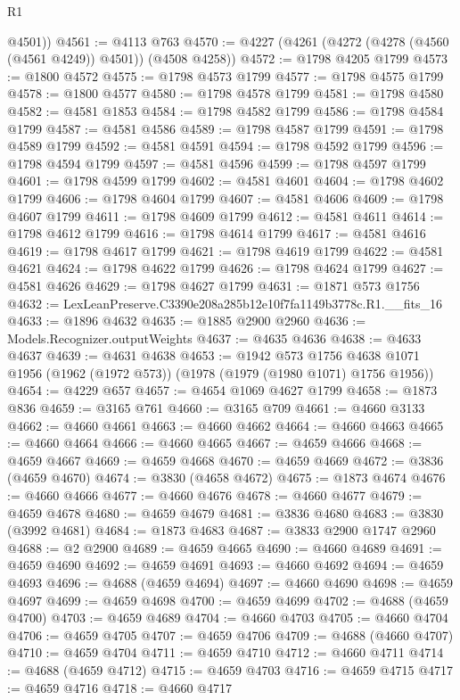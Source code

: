 \begin{lexlean}{R1}
\begin{coremodule}
        @4501))
@4561 := @4113 @763
@4570 := @4227 (@4261 (@4272 (@4278 (@4560 (@4561 @4249)) @4501)) (@4508 @4258))
@4572 := @1798 @4205 @1799
@4573 := @1800 @4572
@4575 := @1798 @4573 @1799
@4577 := @1798 @4575 @1799
@4578 := @1800 @4577
@4580 := @1798 @4578 @1799
@4581 := @1798 @4580
@4582 := @4581 @1853
@4584 := @1798 @4582 @1799
@4586 := @1798 @4584 @1799
@4587 := @4581 @4586
@4589 := @1798 @4587 @1799
@4591 := @1798 @4589 @1799
@4592 := @4581 @4591
@4594 := @1798 @4592 @1799
@4596 := @1798 @4594 @1799
@4597 := @4581 @4596
@4599 := @1798 @4597 @1799
@4601 := @1798 @4599 @1799
@4602 := @4581 @4601
@4604 := @1798 @4602 @1799
@4606 := @1798 @4604 @1799
@4607 := @4581 @4606
@4609 := @1798 @4607 @1799
@4611 := @1798 @4609 @1799
@4612 := @4581 @4611
@4614 := @1798 @4612 @1799
@4616 := @1798 @4614 @1799
@4617 := @4581 @4616
@4619 := @1798 @4617 @1799
@4621 := @1798 @4619 @1799
@4622 := @4581 @4621
@4624 := @1798 @4622 @1799
@4626 := @1798 @4624 @1799
@4627 := @4581 @4626
@4629 := @1798 @4627 @1799
@4631 := @1871 @573 @1756
@4632 := LexLeanPreserve.C3390e208a285b12e10f7fa1149b3778c.R1.__fits_16
@4633 := @1896 @4632
@4635 := @1885 @2900 @2960
@4636 := Models.Recognizer.outputWeights
@4637 := @4635 @4636
@4638 := @4633 @4637
@4639 := @4631 @4638
@4653 := @1942
    @573
    @1756
    @4638
    @1071
    @1956
    (@1962 (@1972 @573))
    (@1978 (@1979 (@1980 @1071) @1756 @1956))
@4654 := @4229 @657
@4657 := @4654 @1069 @4627 @1799
@4658 := @1873 @836
@4659 := @3165 @761
@4660 := @3165 @709
@4661 := @4660 @3133
@4662 := @4660 @4661
@4663 := @4660 @4662
@4664 := @4660 @4663
@4665 := @4660 @4664
@4666 := @4660 @4665
@4667 := @4659 @4666
@4668 := @4659 @4667
@4669 := @4659 @4668
@4670 := @4659 @4669
@4672 := @3836 (@4659 @4670)
@4674 := @3830 (@4658 @4672)
@4675 := @1873 @4674
@4676 := @4660 @4666
@4677 := @4660 @4676
@4678 := @4660 @4677
@4679 := @4659 @4678
@4680 := @4659 @4679
@4681 := @3836 @4680
@4683 := @3830 (@3992 @4681)
@4684 := @1873 @4683
@4687 := @3833 @2900 @1747 @2960
@4688 := @2 @2900
@4689 := @4659 @4665
@4690 := @4660 @4689
@4691 := @4659 @4690
@4692 := @4659 @4691
@4693 := @4660 @4692
@4694 := @4659 @4693
@4696 := @4688 (@4659 @4694)
@4697 := @4660 @4690
@4698 := @4659 @4697
@4699 := @4659 @4698
@4700 := @4659 @4699
@4702 := @4688 (@4659 @4700)
@4703 := @4659 @4689
@4704 := @4660 @4703
@4705 := @4660 @4704
@4706 := @4659 @4705
@4707 := @4659 @4706
@4709 := @4688 (@4660 @4707)
@4710 := @4659 @4704
@4711 := @4659 @4710
@4712 := @4660 @4711
@4714 := @4688 (@4659 @4712)
@4715 := @4659 @4703
@4716 := @4659 @4715
@4717 := @4659 @4716
@4718 := @4660 @4717

\end{coremodule}
\end{lexlean}
